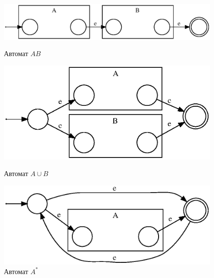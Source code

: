 \begin{figure}[h]
\begin{minipage}{.5\textwidth}
        \centering
        \includegraphics[scale=0.55]{graphs/8.8.dot.eps}
        \caption{Автомат $AB$}
        \end{minipage}%
    \begin{minipage}{.5\textwidth}
        \centering
        \includegraphics[scale=0.55]{graphs/8.9.dot.eps}
        \caption{Автомат $A\cup B$}
    \end{minipage}
    \begin{minipage}{.5\textwidth}
        \centering
        \includegraphics[scale=0.6]{graphs/8.10.dot.eps}
        \caption{Автомат $A^*$}
    \end{minipage}
\end{figure}


